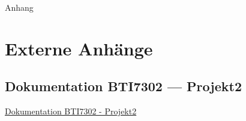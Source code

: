 \begin{titlepage}


    \clearpage
    \vspace*{\fill}
    \begin{center}
        \begin{minipage}{.6\textwidth}
            \fontsize{26pt}{28pt}\selectfont
            Anhang
        \end{minipage}
    \end{center}
    \vfill %
    \clearpage


\end{titlepage}

\newpage 


\appendix

\chapter{Externe Anhänge}
\label{chap:anh_ext}




\section*{Dokumentation BTI7302 --- Projekt2}
\label{sec:anhang:projekt2}
\href{../Extern/EigeneDokumente/DokumentationProjekt2.pdf}{Dokumentation BTI7302 - Projekt2}

